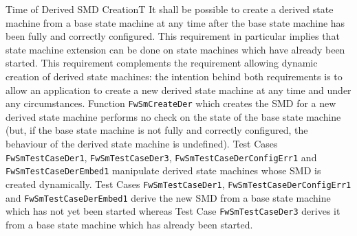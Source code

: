 \documentclass[requirements]{../fwprofile}
\begin{document}
\begin{fw_req_note}{Time of Derived SMD Creation}{T}
{It shall be possible to create a derived state machine from a 
base state machine at any time after the base state machine has been fully and correctly 
configured.}
{This requirement in particular implies that state machine extension can 
be done on state machines which have already been started.}
{This requirement complements the requirement allowing dynamic 
creation of derived state machines: the intention behind both requirements is to allow an 
application to create a new derived state machine at any time and under any circumstances.}
{Function \texttt{FwSmCreateDer} which creates the SMD for a new 
derived state machine performs no check on the state of the  base state machine (but, if 
the base state machine is not fully and correctly configured, the behaviour of the derived 
state machine is undefined).} 
{Test Cases \texttt{FwSmTestCaseDer1}, \texttt{FwSmTestCaseDer3}, 
\texttt{FwSmTestCaseDerConfigErr1} and \texttt{FwSmTestCaseDerEmbed1} 
manipulate derived state machines whose SMD is created dynamically. 
Test Cases \texttt{FwSmTestCaseDer1}, \texttt{FwSmTestCaseDerConfigErr1} and 
\texttt{FwSmTestCaseDerEmbed1} derive the new SMD from a base state machine which has not 
yet been started whereas Test Case \texttt{FwSmTestCaseDer3} 
derives it from a base state machine which has already been started.}
\end{fw_req_note}
\end{document}
